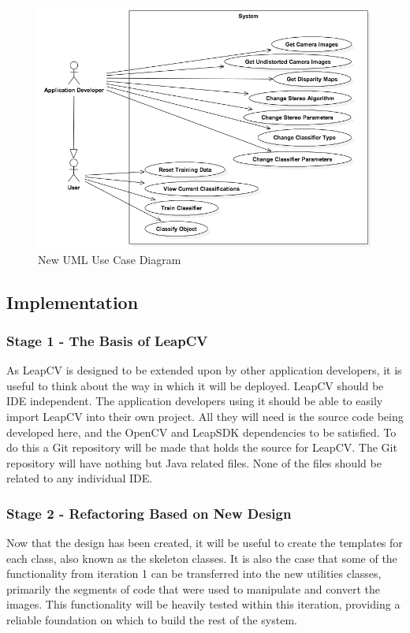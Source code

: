 \documentclass[11pt,oneside]{report}
\begin{document}
			\begin{figure}
			\centering
    				\includegraphics[width=\textwidth]{use_case_2}
    			\caption{New UML Use Case Diagram \protect {\label{fig:use_case_2}}}

			\end{figure}	
		\subsection{Implementation}
		\subsubsection{Stage 1 - The Basis of LeapCV}
			As LeapCV is designed to be extended upon by other application developers, it is useful to think about the way in which it will be deployed.
			LeapCV should be IDE independent.
			The application developers using it should be able to easily import LeapCV into their own project.
			All they will need is the source code being developed here, and the OpenCV and LeapSDK dependencies to be satisfied.
			To do this a Git repository will be made that holds the source for LeapCV.
			The Git repository will have nothing but Java related files.
			None of the files should be related to any individual IDE.

		\subsubsection{Stage 2 - Refactoring Based on New Design}
			Now that the design has been created, it will be useful to create the templates for each class, also known as the skeleton classes.
			It is also the case that some of the functionality from iteration 1 can be transferred into the new utilities classes, primarily the segments of code that were used to manipulate and convert the images.
			This functionality will be heavily tested within this iteration, providing a reliable foundation on which to build the rest of the system.
			
\end{document}
